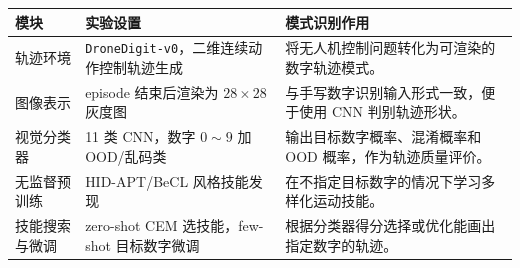 \begin{tabular}{p{3.0cm}p{4.2cm}p{5.0cm}}
\toprule
模块 & 实验设置 & 模式识别作用 \\
\midrule
轨迹环境 & \texttt{DroneDigit-v0}，二维连续动作控制轨迹生成 & 将无人机控制问题转化为可渲染的数字轨迹模式。\\
图像表示 & episode 结束后渲染为 $28\times 28$ 灰度图 & 与手写数字识别输入形式一致，便于使用 CNN 判别轨迹形状。\\
视觉分类器 & 11 类 CNN，数字 $0\sim9$ 加 OOD/乱码类 & 输出目标数字概率、混淆概率和 OOD 概率，作为轨迹质量评价。\\
无监督预训练 & HID-APT/BeCL 风格技能发现 & 在不指定目标数字的情况下学习多样化运动技能。\\
技能搜索与微调 & zero-shot CEM 选技能，few-shot 目标数字微调 & 根据分类器得分选择或优化能画出指定数字的轨迹。\\
\bottomrule
\end{tabular}
